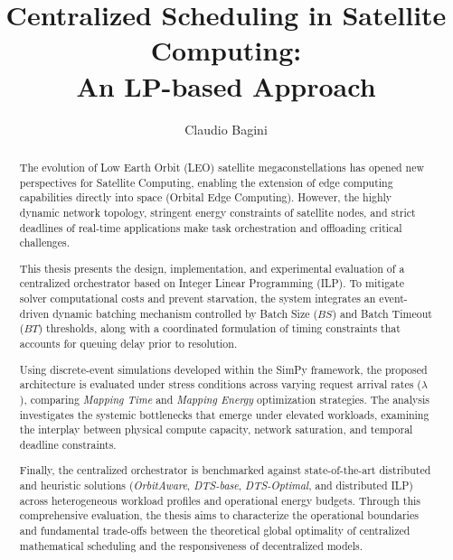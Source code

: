 \documentclass[english, oneside]{sapthesis}
\title{Centralized Scheduling in Satellite Computing:\\ An LP-based Approach}
\author{Claudio Bagini}
\begin{document}
\frontmatter
\maketitle

\dedication{To countless cups of coffee, endless iterations,\\
and the version of me that refused to drop the task.}

\begin{abstract}
The evolution of Low Earth Orbit (LEO) satellite megaconstellations has opened new perspectives for Satellite Computing, enabling the extension of edge computing capabilities directly into space (Orbital Edge Computing). However, the highly dynamic network topology, stringent energy constraints of satellite nodes, and strict deadlines of real-time applications make task orchestration and offloading critical challenges.

This thesis presents the design, implementation, and experimental evaluation of a centralized orchestrator based on Integer Linear Programming (ILP). To mitigate solver computational costs and prevent starvation, the system integrates an event-driven dynamic batching mechanism controlled by Batch Size ($BS$) and Batch Timeout ($BT$) thresholds, along with a coordinated formulation of timing constraints that accounts for queuing delay prior to resolution.

Using discrete-event simulations developed within the SimPy framework, the proposed architecture is evaluated under stress conditions across varying request arrival rates ($\lambda$), comparing \emph{Mapping Time} and \emph{Mapping Energy} optimization strategies. The analysis investigates the systemic bottlenecks that emerge under elevated workloads, examining the interplay between physical compute capacity, network saturation, and temporal deadline constraints.

Finally, the centralized orchestrator is benchmarked against state-of-the-art distributed and heuristic solutions (\emph{OrbitAware}, \emph{DTS-base}, \emph{DTS-Optimal}, and distributed ILP) across heterogeneous workload profiles and operational energy budgets. Through this comprehensive evaluation, the thesis aims to characterize the operational boundaries and fundamental trade-offs between the theoretical global optimality of centralized mathematical scheduling and the responsiveness of decentralized models.
\end{abstract}

\tableofcontents
\end{document}
